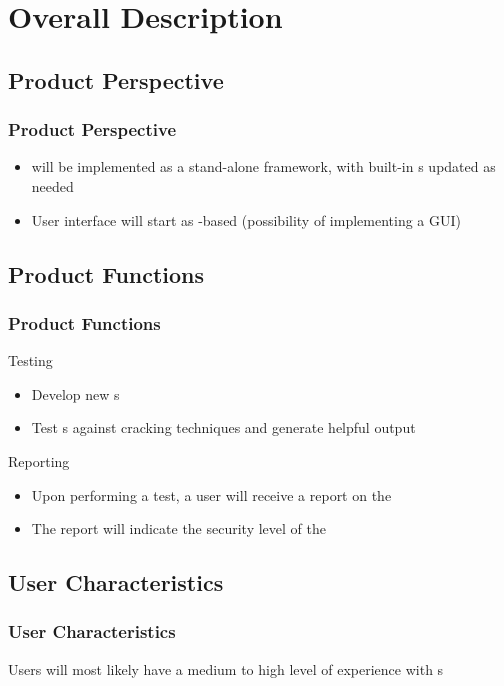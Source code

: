 
\section{Overall Description}


\subsection{Product Perspective}

\begin{frame} %
\frametitle{Product Perspective}
\begin{itemize}
\item \cry{} will be implemented as a stand-alone framework,
  with built-in \cs s updated as needed
\item User interface will start as \cl-based
  (possibility of implementing a GUI)
\end{itemize}
\end{frame}


\subsection{Product Functions}
\begin{frame}
\frametitle{Product Functions}
Testing
\begin{itemize}
  \item Develop new \cs s
  \item Test \cs s against cracking techniques and generate helpful output
\end{itemize}
Reporting
\begin{itemize}
\item Upon performing a test, a user will receive a report on
  the \cs
\item The report will indicate the security level of the \cs
\end{itemize}
\end{frame}


\subsection{User Characteristics}
\begin{frame}
\frametitle{User Characteristics}
Users will most likely have a medium  to high level of
experience with \cs s
\end{frame}


